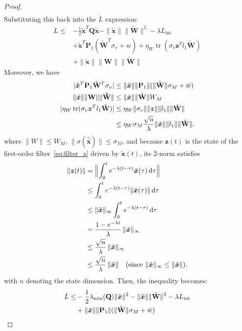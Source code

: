 \documentclass[10pt,twocolumn]{ICCAS}
\newcommand{\tr}{\operatorname{tr}}
\newcommand{\xtilde}{\tilde{\bm{x}}}
\newcommand{\xhatbar}{\hat{\bar{\bm{x}}}}
\newcommand{\Wtilde}{\tilde{\mathbf{W}}}
\newcommand{\What}{\hat{\mathbf{W}}}
\begin{document}
\begin{proof}
\begin{align*}
\end{align*}
Substituting this back into the $\dot{L}$ expression:
\begin{align*}
    \dot{L} \le &-\frac{1}{2}\xtilde^T\mathbf{Q}\xtilde  -\|\xtilde\| \|\Wtilde\|^{2} - \lambda L_{\text{int}} \\
    & + \xtilde^T\mathbf{P}_{1} (\Wtilde^T \sigma_v + w) + \eta_W \tr(\sigma_v {\bm{z}^T} l_{1} \Wtilde) \\
    &+  \|\xtilde\| \|\mathbf{W}\|\|\Wtilde\|
\end{align*}
Moreover, we have
\begin{align*}
    |\xtilde^T\mathbf{P}_1 \Wtilde^T \sigma_v| &\le \|\xtilde\|\|\mathbf{P}_1\|(\|\Wtilde\| \sigma_{M} + \bar{w})\\
    \|\xtilde\| \|\bf{W}\|\|\What\| &\le \|\xtilde\|\|\Wtilde\| W_M \\
        |\eta_W \tr(\sigma_v \bm{z}^T l_1 \Wtilde)|
    &\le \eta_W \|\sigma_v\| \|\bm{z}\| \|l_1\| \|\Wtilde\| \\
    &\le \eta_W \sigma_M \frac{\sqrt{n}}{\lambda} \|\xtilde\| \|l_1\| \|\Wtilde\|.
\end{align*}
where $\|W\|\le W_M$, $\|\sigma(\xhatbar)\|\le \sigma_M$, and
because $\bm z(t)$ is the state of the first-order filter~\eqref{eq:filter_z}
driven by $\xtilde(t)$, its 2-norm satisfies
\begin{align*}
    \|\bm z(t)\|
    &= \Bigl\| \int_{0}^{t} e^{-\lambda(t-\tau)} \xtilde(\tau)\,\mathrm d\tau \Bigr\| \notag\\
    &\le \int_{0}^{t} e^{-\lambda(t-\tau)} \|\xtilde(\tau)\|\,\mathrm d\tau \notag\\
    &\le \|\xtilde\|_{\infty} \int_{0}^{t} e^{-\lambda(t-\tau)}\,\mathrm d\tau \notag\\
    &= \frac{1-e^{-\lambda t}}{\lambda}\,\|\xtilde\|_{\infty} \notag\\
    &\le \frac{\sqrt{n}}{\lambda}\,\|\xtilde\|_{\infty} \notag\\
    &\le \frac{\sqrt{n}}{\lambda}\,\|\xtilde\| \quad (\text{since } \|\xtilde\|_{\infty}\le\|\xtilde\|).
\end{align*}
with $n$ denoting the state dimension. Then, the inequality becomes:
\begin{align*}
    \dot{L} \le 
    & -\frac{1}{2}\lambda_{\min}(\mathbf{Q})\|\xtilde\|^2 - \|\xtilde\|\|\Wtilde\|^2 - \lambda L_{\text{int}} \notag \\
    &+ \|\xtilde\|\|\mathbf{P}_1\|(\|\Wtilde\| \sigma_{M} + \bar{w}) \\

\end{align*}
\end{proof}
\end{document}
